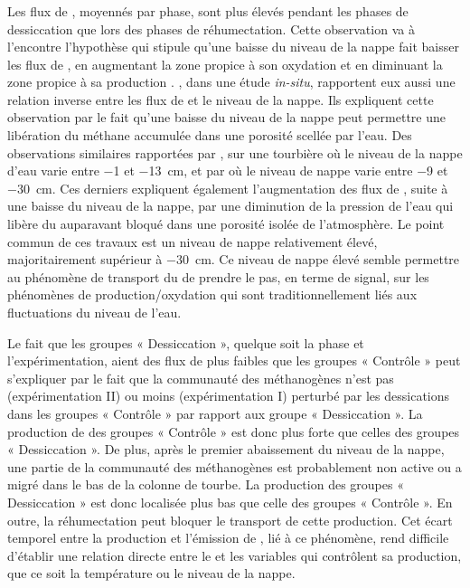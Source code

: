 \subsubsection{\chh}
Les flux de \chh, moyennés par phase, sont plus élevés pendant les phases de dessiccation que lors des phases de réhumectation.
Cette observation va à l'encontre l'hypothèse qui stipule qu'une baisse du niveau de la nappe fait baisser les flux de \chh, en augmentant la zone propice à son oxydation et en diminuant la zone propice à sa production \citep{aerts1997,pelletier2007,turetsky2008}.
\citet{kettunen1996}, dans une étude \textit{in-situ}, rapportent eux aussi une relation inverse entre les flux de \chh et le niveau de la nappe.
Ils expliquent cette observation par le fait qu'une baisse du niveau de la nappe peut permettre une libération du méthane accumulée dans une porosité scellée par l'eau.
Des observations similaires rapportées par \citet{bellisario1999}, sur une tourbière où le niveau de la nappe d'eau varie entre \num{-1} et \SI{-13}{\centi\metre}, et par \citet{treat2007} où le niveau de nappe varie entre \num{-9} et \SI{-30}{\centi\metre}.
Ces derniers expliquent également l'augmentation des flux de \chh, suite à une baisse du niveau de la nappe, par une diminution de la pression de l'eau qui libère du \chh auparavant bloqué dans une porosité isolée de l'atmosphère.
Le point commun de ces travaux est un niveau de nappe relativement élevé, majoritairement supérieur à \SI{-30}{\centi\metre}.
Ce niveau de nappe élevé semble permettre au phénomène de transport du \chh de prendre le pas, en terme de signal, sur les phénomènes de production/oxydation qui sont traditionnellement liés aux fluctuations du niveau de l'eau.

Le fait que les groupes « Dessiccation », quelque soit la phase et l'expérimentation, aient des flux de \chh plus faibles que les groupes « Contrôle » peut s'expliquer par le fait que la communauté des méthanogènes n'est pas (expérimentation II) ou moins (expérimentation I) perturbé par les dessications dans les groupes « Contrôle » par rapport aux groupe « Dessiccation ».
La production de \chh des groupes « Contrôle » est donc plus forte que celles des groupes « Dessiccation ».
De plus, après le premier abaissement du niveau de la nappe, une partie de la communauté des méthanogènes est probablement non active ou a migré dans le bas de la colonne de tourbe.
La production des groupes « Dessiccation » est donc localisée plus bas que celle des groupes « Contrôle ».
En outre, la réhumectation peut bloquer le transport de cette production.
Cet écart temporel entre la production et l'émission de \chh, lié à ce phénomène, rend difficile d'établir une relation directe entre le \chh et les variables qui contrôlent sa production, que ce soit la température ou le niveau de la nappe.

